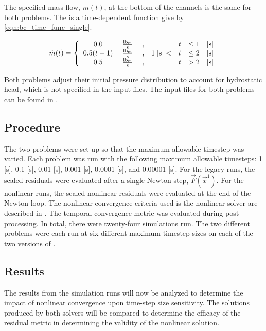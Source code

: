 The specified mass flow, $\dot{m}(t)$, at the bottom of the channels is the same for both problems. 
The is a time-dependent function give by \eqref{eqn:bc_time_func_single}.

\begin{equation}
\label{eqn:bc_time_func_single}
\dot{m}(t) = \left\{
\begin{array}{cclrcll}
 0.0           & [\frac{ \lbm{} }{\text{s}}] & , &                & t & \leq 1 & [\text{s}] \\
 0.5 ( t - 1)  & [\frac{ \lbm{} }{\text{s}}] & , & 1\; [\text{s}] < & t & \leq 2 & [\text{s}] \\
 0.5           & [\frac{ \lbm{} }{\text{s}}] & , &                & t & > 2    & [\text{s}]
\end{array}\right.
\end{equation}

Both problems adjust their initial pressure distribution to account for hydrostatic head, which is not specified in the input files.
The \cobra{} input files for both problems can be found in .

\subsection{Procedure}
\label{subsect:procedures}

The two problems were set up so that the maximum allowable timestep was varied.
Each problem was run with the following maximum allowable timesteps: 1 [s], 0.1 [s], 0.01 [s], 0.001 [s], 0.0001 [s], and 0.00001 [s]. 
For the legacy runs, the scaled residuals were evaluated after a single Newton step, $\vec{F}(\vec{x}^{1})$.
For the nonlinear runs, the scaled nonlinear residuals were evaluated at the end of the Newton-loop.
The nonlinear convergence criteria used is the nonlinear solver are described in .
The temporal convergence metric was evaluated during post-processing.
In total, there were twenty-four simulations run.
The two different problems were each run at six different maximum timestep sizes on each of the two versions of \cobra{}.

\subsection{Results}
\label{subsect:results}

The results from the simulation runs will now be analyzed to determine the impact of nonlinear convergence upon time-step size sensitivity.
The solutions produced by both solvers will be compared to determine the efficacy of the residual metric in determining the validity of the nonlinear solution.  

